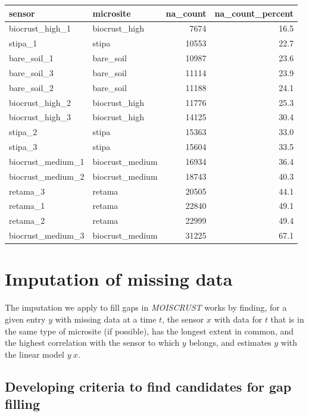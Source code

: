 \documentclass[
  table]{article}
\begin{document}
\begin{table}[H]
\centering
\begin{tabular}[t]{l|l|r|r}
\hline
sensor & microsite & na\_count & na\_count\_percent\\
\hline
biocrust\_high\_1 & biocrust\_high & 7674 & 16.5\\
\hline
stipa\_1 & stipa & 10553 & 22.7\\
\hline
bare\_soil\_1 & bare\_soil & 10987 & 23.6\\
\hline
bare\_soil\_3 & bare\_soil & 11114 & 23.9\\
\hline
bare\_soil\_2 & bare\_soil & 11188 & 24.1\\
\hline
biocrust\_high\_2 & biocrust\_high & 11776 & 25.3\\
\hline
biocrust\_high\_3 & biocrust\_high & 14125 & 30.4\\
\hline
stipa\_2 & stipa & 15363 & 33.0\\
\hline
stipa\_3 & stipa & 15604 & 33.5\\
\hline
biocrust\_medium\_1 & biocrust\_medium & 16934 & 36.4\\
\hline
biocrust\_medium\_2 & biocrust\_medium & 18743 & 40.3\\
\hline
retama\_3 & retama & 20505 & 44.1\\
\hline
retama\_1 & retama & 22840 & 49.1\\
\hline
retama\_2 & retama & 22999 & 49.4\\
\hline
biocrust\_medium\_3 & biocrust\_medium & 31225 & 67.1\\
\hline
\end{tabular}
\end{table}

\hypertarget{imputation-of-missing-data}{%
\section{Imputation of missing data}\label{imputation-of-missing-data}}

The imputation we apply to fill gaps in \emph{MOISCRUST} works by
finding, for a given entry \(y\) with missing data at a time \(t\), the
sensor \(x\) with data for \(t\) that is in the same type of microsite
(if possible), has the longest extent in common, and the highest
correlation with the sensor to which \(y\) belongs, and estimates \(y\)
with the linear model \(y ~ x\).

\hypertarget{developing-criteria-to-find-candidates-for-gap-filling}{%
\subsection{Developing criteria to find candidates for gap
filling}\label{developing-criteria-to-find-candidates-for-gap-filling}}
\end{document}
